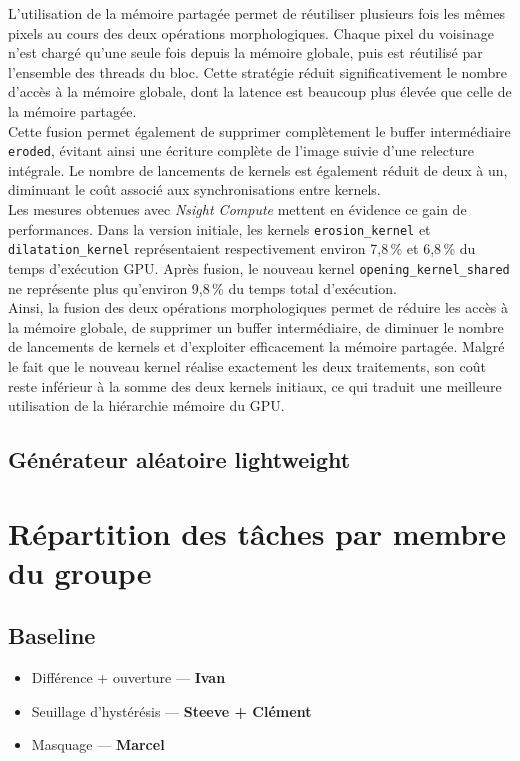 \documentclass[12pt]{article}
\begin{document}
    L'utilisation de la mémoire partagée permet de réutiliser plusieurs fois les mêmes pixels au cours des deux opérations morphologiques. Chaque pixel du voisinage n'est chargé qu'une seule fois depuis la mémoire globale, puis est réutilisé par l'ensemble des threads du bloc. Cette stratégie réduit significativement le nombre d'accès à la mémoire globale, dont la latence est beaucoup plus élevée que celle de la mémoire partagée.
    \\
    Cette fusion permet également de supprimer complètement le buffer intermédiaire \verb|eroded|, évitant ainsi une écriture complète de l'image suivie d'une relecture intégrale. Le nombre de lancements de kernels est également réduit de deux à un, diminuant le coût associé aux synchronisations entre kernels.
    \\
    Les mesures obtenues avec \textit{Nsight Compute} mettent en évidence ce gain de performances. Dans la version initiale, les kernels \verb|erosion_kernel| et \verb|dilatation_kernel| représentaient respectivement environ 7,8\,\% et 6,8\,\% du temps d'exécution GPU. Après fusion, le nouveau kernel \verb|opening_kernel_shared| ne représente plus qu'environ 9,8\,\% du temps total d'exécution.
    \\
    Ainsi, la fusion des deux opérations morphologiques permet de réduire les accès à la mémoire globale, de supprimer un buffer intermédiaire, de diminuer le nombre de lancements de kernels et d'exploiter efficacement la mémoire partagée. Malgré le fait que le nouveau kernel réalise exactement les deux traitements, son coût reste inférieur à la somme des deux kernels initiaux, ce qui traduit une meilleure utilisation de la hiérarchie mémoire du GPU.

    \subsection{Générateur aléatoire lightweight}

    \bigskip

    \section{Répartition des tâches par membre du groupe}

    \subsection{Baseline}
    \begin{itemize}[leftmargin=1.5cm]
    \item Différence + ouverture \hfill --- \textbf{Ivan}
    \item Seuillage d'hystérésis \hfill --- \textbf{Steeve + Clément}
    \item Masquage \hfill --- \textbf{Marcel}
    \end{itemize}
\end{document}
